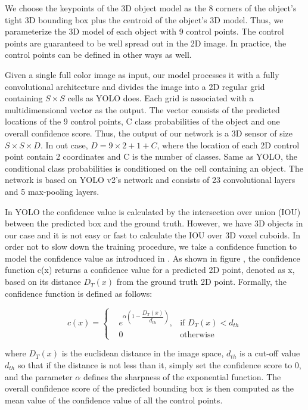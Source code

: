 We choose the keypoints of the 3D object model as the 8 corners of the object's tight 3D bounding box plus the centroid of the object's 3D model. Thus, we parameterize the 3D model of each object with 9 control points. The control points are guaranteed to be well spread out in the 2D image. In practice, the control points can be defined in other ways as well.

Given a single full color image as input, our model processes it with a fully convolutional architecture and divides the image into a 2D regular grid containing $ S \times S $ cells as YOLO does. Each grid is associated with a multidimensional vector as the output. The vector consists of the predicted locations of the 9 control points, C class probabilities of the object and one overall confidence score. Thus, the output of our network is a 3D sensor of size $ S \times S \times D $. In out case, $D = 9\times2+1+C$, where the location of each 2D control point contain 2 coordinates and C is the number of classes. Same as YOLO, the conditional class probabilities is  conditioned on the cell containing an object. The network is based on YOLO v2's network and consists of 23 convolutional layers and 5 max-pooling layers.

In YOLO the confidence value is calculated by the intersection over union (IOU) between the predicted box and the ground truth. However, we have 3D objects in our case and it is not easy or fast to calculate the IOU over 3D voxel cuboids. In order not to slow down the training procedure, we take a confidence function to model the confidence value as introduced in \cite{tekin2018real}. As shown in figure , the confidence function c(x) returns a confidence value for a predicted 2D point, denoted as x, based on its distance $ D_{T}(x) $ from the ground truth 2D point. Formally, the confidence function is defined as follows:

\begin{equation}
c(x)=\left\{
\begin{aligned}
&e^{\alpha(1-\dfrac{D_{T}(x)}{d_{th}})}, &\text{if } D_{T}(x) < d_{th}\\
&0 &\text{otherwise}
\end{aligned}
\right.
\end{equation}

where $ D_{T}(x) $ is the euclidean distance in the image space, $ d_{th} $ is a cut-off value $ d_{th} $ so that if the distance is not less than it, simply set the confidence score to 0, and the parameter $ \alpha $ defines the sharpness of the exponential function. The overall confidence score of the predicted bounding box is then computed as the mean value of the confidence value of all the control points.

